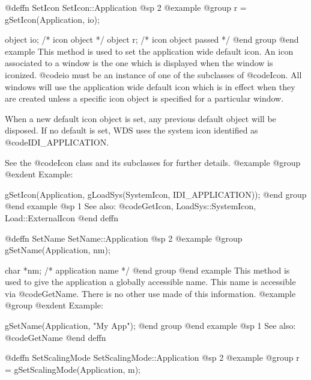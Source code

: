 @deffn {SetIcon} SetIcon::Application
@sp 2
@example
@group
r = gSetIcon(Application, io);

object  io;     /*  icon object         */
object  r;      /*  icon object passed  */
@end group
@end example
This method is used to set the application wide default icon.  An icon
associated to a window is the one which is displayed when the window is
iconized.  @code{io} must be an instance of one of the subclasses of
@code{Icon}.  All windows will use the application wide default icon
which is in effect when they are created unless a specific icon object
is specified for a particular window.

When a new default icon object is set, any previous default object
will be disposed.  If no default is set, WDS uses the system icon
identified as @code{IDI_APPLICATION}.

See the @code{Icon} class and its subclasses for further details.
@example
@group
@exdent Example:

gSetIcon(Application, gLoadSys(SystemIcon, IDI_APPLICATION));
@end group
@end example
@sp 1
See also:  @code{GetIcon, LoadSys::SystemIcon, Load::ExternalIcon}
@end deffn












@deffn {SetName} SetName::Application
@sp 2
@example
@group
gSetName(Application, nm);

char    *nm;    /*  application name  */
@end group
@end example
This method is used to give the application a globally accessible name.
This name is accessible via @code{GetName}.  There is no other use
made of this information.
@example
@group
@exdent Example:

gSetName(Application, "My App");
@end group
@end example
@sp 1
See also:  @code{GetName}
@end deffn















@deffn {SetScalingMode} SetScalingMode::Application
@sp 2
@example
@group
r = gSetScalingMode(Application, m);

